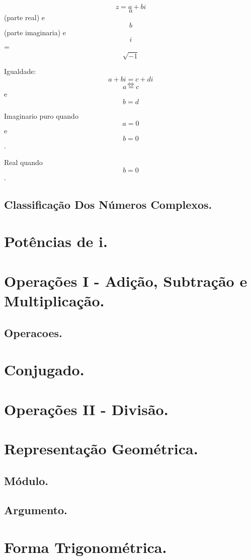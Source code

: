 \documentclass[a4paper,12pt]{article}
\begin{document}
$$z = a + bi$$
$$a$$ (parte real) e $$b$$ (parte imaginaria) e $$i$$ = $$\sqrt{-1}$$

Igualdade: $$a + bi = c +di$$ $$\Leftrightarrow$$ $$a = c$$ e $$b = d$$

Imaginario puro quando $$a = 0$$ e $$b = 0$$.

Real quando $$b = 0$$.

\subsection{Classificação Dos Números Complexos.}



\section{Potências de i.}

\section{Operações I - Adição, Subtração e Multiplicação.}

\subsection{Operacoes.}

\section{Conjugado.}

\section{Operações II - Divisão.}

\section{Representação Geométrica.}

\subsection{Módulo.}

\subsection{Argumento.}

\section{Forma Trigonométrica.}
\end{document}
